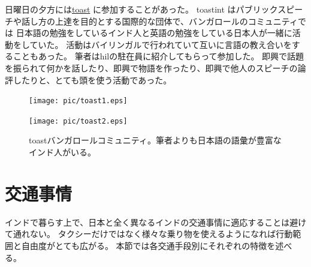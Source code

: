\par
日曜日の夕方には\href{https://www.facebook.com/jinseidojo/timeline}{\acrlong{toast}} \cite{toast}に参加することがあった。
\acrshort{toastint} \cite{toastint}はパブリックスピーチや話し方の上達を目的とする国際的な団体で、バンガロールのコミュニティでは
日本語の勉強をしているインド人と英語の勉強をしている日本人が一緒に活動をしていた。
活動はバイリンガルで行われていて互いに言語の教え合いをすることもあった。
筆者は\acrshort{hil}の駐在員に紹介してもらって参加した。
即興で話題を振られて何かを話したり、即興で物語を作ったり、即興で他人のスピーチの論評したりと、とても頭を使う活動であった。
\begin{figure}[ht]
  \begin{minipage}{0.65\hsize}
  \begin{center}
    \texttt{[image: pic/toast1.eps]}
  \end{center}
  \end{minipage}
  \begin{minipage}{0.35\hsize}
  \begin{center}
    \texttt{[image: pic/toast2.eps]}
  \end{center}
  \end{minipage}
  \caption{\acrshort{toast}バンガロールコミュニティ。筆者よりも日本語の語彙が豊富なインド人がいる。}
  \label{toast}
\end{figure}
\section{交通事情}
インドで暮らす上で、日本と全く異なるインドの交通事情に適応することは避けて通れない。
タクシーだけではなく様々な乗り物を使えるようになれば行動範囲と自由度がとても広がる。
本節では各交通手段別にそれぞれの特徴を述べる。
